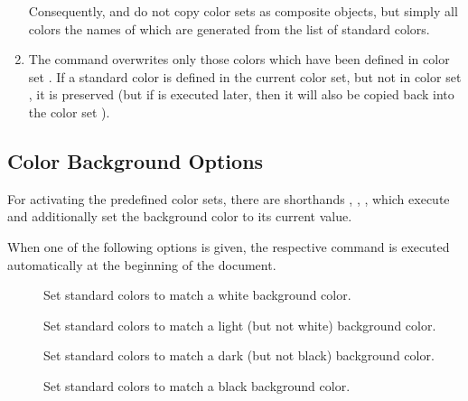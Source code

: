 \begin{slide}
\begin{enumerate}
    Consequently,  and  do not copy color sets as composite objects, but
    simply all colors the names of which are generated from the list of standard colors.

    \newslide

  \item The command  overwrites only those colors which have been defined in color
    set . If a standard color is defined in the current color set, but not in color set , it is
    preserved (but if  is executed later, then it will also be copied back into
    the color set ).
  \end{enumerate}

  \newslide

  \subsection{Color Background Options}\label{Sec:ColBgdOpt}
  For activating the predefined color sets, there are shorthands
  ,
  ,
  ,
   which execute
   and additionally set the background color to its current value.

  \newslide

  When one of the following options is given, the respective command is executed automatically at the beginning of the
  document.
  \begin{description}
  \item[]
    Set standard colors to match a white background color.

  \item[]
    Set standard colors to match a light (but not white) background color.

  \item[]
    Set standard colors to match a dark (but not black) background color.

  \item[]
    Set standard colors to match a black background color.
  \end{description}


\end{slide}
